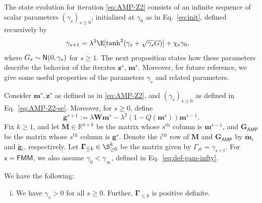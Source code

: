 \documentclass[]{article}
\def\sx{{\mathsf x}}
\def\bGamma{\boldsymbol{\Gamma}}
\def\bW{{\boldsymbol W}}
\def\normal{{\sf N}}
\def\bM{{\boldsymbol M}}
\def\bz{{\boldsymbol z}}
\def\bg{{\boldsymbol g}}
\def\reals{{\mathbb R}}
\def\bW{{\boldsymbol W}}
\def\bG{{\boldsymbol G}}
\def\bz{{\boldsymbol z}}
\def\normal{{\sf N}}
\def\bg{{\boldsymbol g}}
\def\bbm{{\boldsymbol m}}
\def\AMP{\mathsf{AMP}}
\def\brevebm{\breve{\boldsymbol{m}}{}}
\def\brevebg{\breve{\boldsymbol{g}}{}}
\def\FMM{\mathsf{FMM}}
\begin{document}
The state evolution for iteration \eqref{eq:AMP-Z2} consists of an infinite sequence of scalar parameters $(\gamma_s)_{s \geq 0}$,
initialized at $\gamma_0$ as in Eq.~\eqref{eq:init},
defined recursively by
\begin{equation}
\label{eq:AMP-Z2-se}
\begin{aligned}
    \gamma_{s+1} &= \lambda^2 \E[\tanh^2(\gamma_s + \sqrt{\gamma_s}G)] + \chi_{\sx} \gamma_0,
\end{aligned}
\end{equation}
where $G_s \sim \normal(0,\gamma_s)$ for $s \geq 1$.
The next proposition states how these parameters describe the behavior of the iterates $\bz^s$, $\bbm^s$.
Moreover, for future reference,
we give some useful properties of the parameters $\gamma_s$ and related parameters.
\begin{proposition}\label{prop:Z2-se}
    Consider $\bbm^s,\bz^s$ as defined as in \eqref{eq:AMP-Z2},
    and $(\gamma_s)_{s \geq 0}$ as defined in Eq.~\eqref{eq:AMP-Z2-se}.
    Moreover,
    for $s \geq 0$,
    define
    \begin{equation}
    \label{eq:def-gs}
        \bg^{s+1} := \lambda \bW\bbm^s - \lambda^2(1-Q(\bbm^s))\bbm^{s-1}.
    \end{equation}
    Fix $k \geq 1$, 
    and let $\bM \in \reals^{n \times k}$ be the matrix whose $s^\text{th}$ column is $\bbm^{s-1}$, 
    and $\bG_{\AMP}$ be the matrix whose $s^\text{th}$ column is $\bg^s$.
    Denote the $i^\text{th}$ row of $\bM$ and $\bG_{\AMP}$ by $\brevebm_i$ and $\brevebg_i$, respectively.
    Let $\bGamma_{\leq k} \in \S^k_{\geq0}$ be the matrix given by $\Gamma_{st} = \gamma_{s \wedge t}$.
    For $\sx = \FMM$,
    we also assume $\gamma_0 < \gamma_\infty$, defined in Eq.~\eqref{eq:def-gam-infty}.



    We have the following:

    \begin{enumerate}[(i)]

        \item %
        We have $\gamma_s > 0$ for all $s \geq 0$.
        Further, $\bGamma_{\leq k}$ is positive definite.


\end{enumerate}
\end{proposition}
\end{document}
